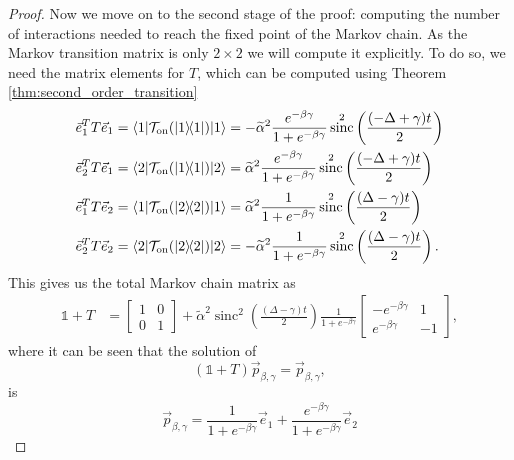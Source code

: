 \documentclass{article}
\newcommand{\on}{\rm on}
\newcommand{\ket}[1]{|#1\rangle}
\newcommand{\bra}[1]{\langle #1|}
\newcommand{\ketbra}[2]{| #1\rangle\! \langle #2|}
\newcommand{\identity}{\mathds{1}}
\DeclareMathOperator{\sinc}{sinc}
\begin{document}
\begin{proof}
 Now we move on to the second stage of the proof: computing the number of interactions needed to reach the fixed point of the Markov chain. As the Markov transition matrix is only $2 \times 2$ we will compute it explicitly. To do so, we need the matrix elements for $T$, which can be computed using Theorem \ref{thm:second_order_transition} 
\begin{align}
        \vec{e}_1^T T \vec{e}_1 = \bra{1} \mathcal{T}_{\on}(\ketbra{1}{1}) \ket{1} &= - \widetilde{\alpha}^2 \frac{e^{-\beta \gamma}}{1 + e^{-\beta \gamma}} \sinc^2 \left( \frac{(-\Delta + \gamma)t}{2}\right) \label{eq:single_qubit_markov_1}\\
        \vec{e}_2^T T \vec{e}_1 = \bra{2} \mathcal{T}_{\on}(\ketbra{1}{1}) \ket{2} &=  \widetilde{\alpha}^2 \frac{e^{-\beta \gamma}}{1 + e^{-\beta \gamma}} \sinc^2 \left( \frac{(-\Delta + \gamma)t}{2}\right) \\
        \vec{e}_1^T T \vec{e}_2 = \bra{1} \mathcal{T}_{\on}(\ketbra{2}{2}) \ket{1} &=  \widetilde{\alpha}^2 \frac{1}{1 + e^{-\beta \gamma}} \sinc^2 \left( \frac{(\Delta - \gamma)t}{2}\right)\\
        \vec{e}_2^T T \vec{e}_2 = \bra{2} \mathcal{T}_{\on}(\ketbra{2}{2}) \ket{2} &= - \widetilde{\alpha}^2 \frac{1}{1 + e^{-\beta \gamma}} \sinc^2 \left( \frac{(\Delta - \gamma)t}{2}\right). \label{eq:single_qubit_markov_4}
    \end{align}
This gives us the total Markov chain matrix as 
\begin{align}
    \identity + T &= \begin{bmatrix} 1 & 0 \\ 0 & 1 \end{bmatrix} + \widetilde{\alpha}^2 \sinc^2 \left(\frac{(\Delta - \gamma)t}{2} \right) \frac{1}{1 + e^{-\beta \gamma}}\begin{bmatrix} -e^{-\beta \gamma} & 1 \\ e^{-\beta \gamma} & -1\end{bmatrix},\label{eq:markov_matrix_single_qubit_gamma}
\end{align}
 where it can be seen that
 the solution of
 \begin{equation}
     (\identity +T)\vec{p}_{\beta,\gamma} = \vec{p}_{\beta,\gamma},
 \end{equation}
 is
 \begin{equation}
     \vec{p}_{\beta, \gamma} = \frac{1}{1 + e^{-\beta \gamma}} \vec{e}_1 + \frac{e^{-\beta \gamma}}{1 + e^{-\beta \gamma}} \vec{e}_2
 \end{equation}

\end{proof}
\end{document}
